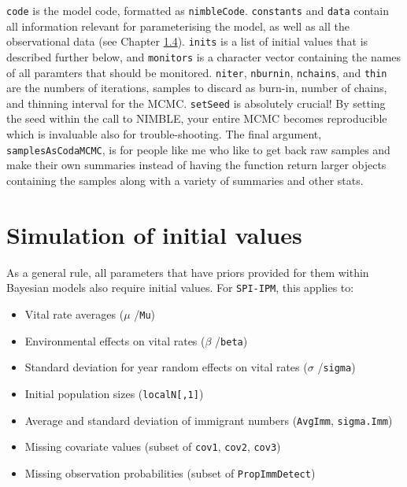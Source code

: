 \documentclass[
]{book}
\providecommand{\tightlist}{%
  \setlength{\itemsep}{0pt}\setlength{\parskip}{0pt}}
\begin{document}
\texttt{code} is the model code, formatted as \texttt{nimbleCode}. \texttt{constants} and \texttt{data}
contain all information relevant for parameterising the model, as well as all
the observational data (see Chapter \protect\hyperlink{ux5cux23ux5cux2520Organisationux5cux2520forux5cux2520analysisux5cux2520withux5cux2520NIMBLE}{1.4}).
\texttt{inits} is a list of initial values that is described further below, and \texttt{monitors}
is a character vector containing the names of all paramters that should be
monitored. \texttt{niter}, \texttt{nburnin}, \texttt{nchains}, and \texttt{thin} are the numbers of iterations,
samples to discard as burn-in, number of chains, and thinning interval for the
MCMC. \texttt{setSeed} is absolutely crucial! By setting the seed within the call to
NIMBLE, your entire MCMC becomes reproducible which is invaluable also for
trouble-shooting. The final argument, \texttt{samplesAsCodaMCMC}, is for people like
me who like to get back raw samples and make their own summaries instead of
having the function return larger objects containing the samples along with
a variety of summaries and other stats.

\hypertarget{simulation-of-initial-values}{%
\section{Simulation of initial values}\label{simulation-of-initial-values}}

As a general rule, all parameters that have priors provided for them within
Bayesian models also require initial values. For \texttt{SPI-IPM}, this applies to:

\begin{itemize}
\tightlist
\item
  Vital rate averages (\(\mu\) /\texttt{Mu})
\item
  Environmental effects on vital rates (\(\beta\) /\texttt{beta})
\item
  Standard deviation for year random effects on vital rates (\(\sigma\) /\texttt{sigma})
\item
  Initial population sizes (\texttt{localN{[},1{]}})
\item
  Average and standard deviation of immigrant numbers (\texttt{AvgImm}, \texttt{sigma.Imm})
\item
  Missing covariate values (subset of \texttt{cov1}, \texttt{cov2}, \texttt{cov3})
\item
  Missing observation probabilities (subset of \texttt{PropImmDetect})
\end{itemize}
\end{document}
